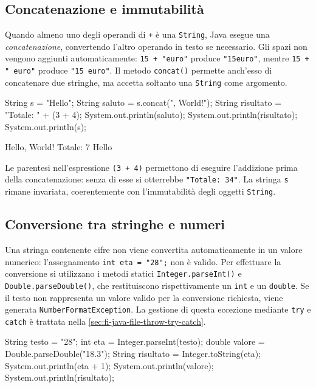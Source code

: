 \subsection{Concatenazione e immutabilità}
\label{sec:fi-java-concatenazione}

Quando almeno uno degli operandi di \texttt{+}
è una \texttt{String}, Java esegue una
\emph{concatenazione}, convertendo l'altro
operando in testo se necessario. Gli spazi
non vengono aggiunti automaticamente:
\texttt{15 + "euro"} produce \texttt{"15euro"},
mentre \texttt{15 + " euro"} produce
\texttt{"15 euro"}. Il metodo \texttt{concat()}
permette anch'esso di concatenare due stringhe,
ma accetta soltanto una \texttt{String} come
argomento.

\begin{unipdcode}[language=Java]
String s = "Hello";
String saluto = s.concat(", World!");
String risultato = "Totale: " + (3 + 4);
System.out.println(saluto);
System.out.println(risultato);
System.out.println(s);
\end{unipdcode}

\begin{unipdterminal}
Hello, World!
Totale: 7
Hello
\end{unipdterminal}

Le parentesi nell'espressione \texttt{(3 + 4)}
permettono di eseguire l'addizione prima della
concatenazione: senza di esse si otterrebbe
\texttt{"Totale: 34"}. La stringa \texttt{s} rimane invariata,
coerentemente con l'immutabilità degli oggetti \texttt{String}.

\subsection{Conversione tra stringhe e numeri}
\label{sec:fi-java-parsing}

Una stringa contenente cifre non viene convertita
automaticamente in un valore numerico: l'assegnamento
\texttt{int eta = "28";} non è valido.
Per effettuare la conversione si utilizzano
i metodi statici \texttt{Integer.parseInt()}
e \texttt{Double.parseDouble()}, che restituiscono
rispettivamente un \texttt{int} e un \texttt{double}.
Se il testo non rappresenta un valore valido
per la conversione richiesta, viene generata
\texttt{NumberFormatException}. La gestione di questa
eccezione mediante \texttt{try} e \texttt{catch} è trattata
nella \cref{sec:fi-java-file-throw-try-catch}.

\begin{unipdcode}[language=Java]
String testo = "28";
int eta = Integer.parseInt(testo);
double valore = Double.parseDouble("18.3");
String risultato = Integer.toString(eta);
System.out.println(eta + 1);
System.out.println(valore);
System.out.println(risultato);
\end{unipdcode}

